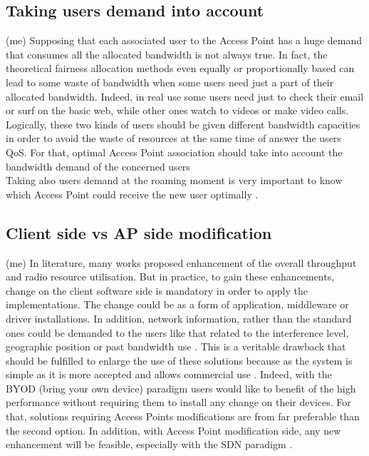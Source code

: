 \documentclass[journal,transmag]{IEEEtran}
\begin{document}
\subsection{Taking users demand into account} (me)
Supposing that each associated user to the Access Point has a huge demand that consumes all the allocated bandwidth is not always true. In fact, the theoretical fairness allocation methods even equally or proportionally based can lead to some waste of bandwidth when some users need just a part of their allocated bandwidth. Indeed, in real use some users need just to check their email or surf on the basic web, while other ones watch to videos or make video calls. Logically, these two kinds of users should be given different bandwidth capacities in order to avoid the waste of resources at the same time of answer the users QoS. For that, optimal Access Point association should take into account the bandwidth demand of the concerned users \cite{16throughput_optimisation_association_bandwidth,16improving_AP_association_channel_utilisation_adaptive_probing,11AP_association_channel_switching, 15Demand_aware_load_balance_WLAN,17QOS_AP_selection}\\
Taking also users demand at the roaming moment is very important to know which Access Point could receive the new user optimally \cite{05DIRAC}.

\subsection{Client side vs AP side modification} (me)
In literature, many works proposed enhancement of the overall throughput and radio resource utilisation. But in practice, to gain these enhancements, change on the client software side is mandatory in order to apply the implementations. The change could be as a form of application, middleware or driver installations. In addition, network information, rather than the standard ones could be demanded to the users like that related to the interference level, geographic position or past bandwidth use \cite{06practical_queue_based_AP_association}. This is a veritable drawback that should be fulfilled to enlarge the use of these solutions because as the system is simple as it is more accepted and allows commercial use \cite{13SmartAP}. Indeed, with the BYOD (bring your own device) paradigm users would like to benefit of the high performance without requiring them to install any change on their devices. 
For that, solutions requiring Access Points modifications are from far preferable than the second option. In addition, with Access Point modification side, any new enhancement will be feasible, especially with the SDN paradigm \cite{14Odin:Programmatic_Orchestration_WiFi}. 
\end{document}
